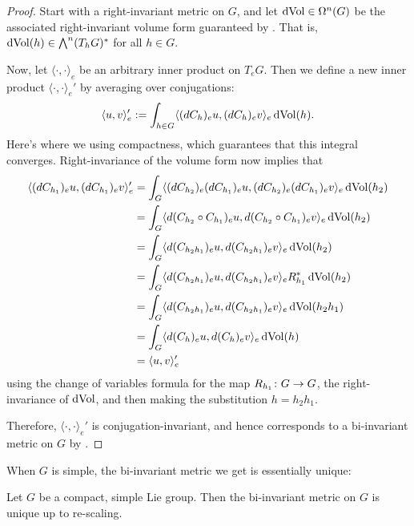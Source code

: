\begin{proof}
	Start with a right-invariant metric on $G$, and let $\operatorname{dVol} \in \Omega^n(G)$ be the associated right-invariant volume form guaranteed by . That is, $\operatorname{dVol}(h) \in \bigwedge^n(T_hG)^\ast$ for all $h \in G$.
	
	Now, let $\langle \cdot , \cdot \rangle_e$ be an arbitrary inner product on $T_eG$. Then we define a new inner product $\langle \cdot , \cdot \rangle_e'$ by averaging over conjugations:
	\[
		\langle u, v \rangle_e' := \int_{h \in G} \langle (dC_h)_e u, (dC_h)_ev \rangle_e \operatorname{dVol}(h).
	\]
	Here's where we using compactness, which guarantees that this integral converges. Right-invariance of the volume form now implies that
	\begin{align*}
		\langle (dC_{h_1})_e u, (dC_{h_1})_e v \rangle_e' & = \int_G \langle (dC_{h_2})_e (dC_{h_1})_e u, (dC_{h_2})_e (dC_{h_1})_e v \rangle_e \operatorname{dVol}(h_2) \\
		& =  \int_G \langle d(C_{h_2} \circ C_{h_1})_e u, d(C_{h_2} \circ C_{h_1})_e v \rangle_e \operatorname{dVol}(h_2) \\
		& =  \int_G \langle d(C_{h_2h_1})_e u, d(C_{h_2h_1})_e v \rangle_e \operatorname{dVol}(h_2) \\
		& =  \int_G \langle d(C_{h_2h_1})_e u, d(C_{h_2h_1})_e v \rangle_e R_{h_1}^\ast \operatorname{dVol}(h_2) \\
		& = \int_G \langle d(C_{h_2h_1})_e u, d(C_{h_2h_1})_e v \rangle_e \operatorname{dVol}(h_2h_1) \\
		& = \int_G \langle d(C_{h})_e u, d(C_{h})_e v \rangle_e \operatorname{dVol}(h) \\
		& = \langle u, v \rangle_e'
	\end{align*}
	using the change of variables formula for the map $R_{h_1} \colon\thinspace\! G \to G$, the right-invariance of $\operatorname{dVol}$, and then making the substitution $h= h_2h_1$.
	
	Therefore, $\langle \cdot , \cdot \rangle_e'$ is conjugation-invariant, and hence corresponds to a bi-invariant metric on $G$ by .
\end{proof}

When $G$ is simple, the bi-invariant metric we get is essentially unique:

\begin{theorem}\label{thm:uniqueness of bi-invariant metrics}
	Let $G$ be a compact, simple Lie group. Then the bi-invariant metric on $G$ is unique up to re-scaling.
\end{theorem}

